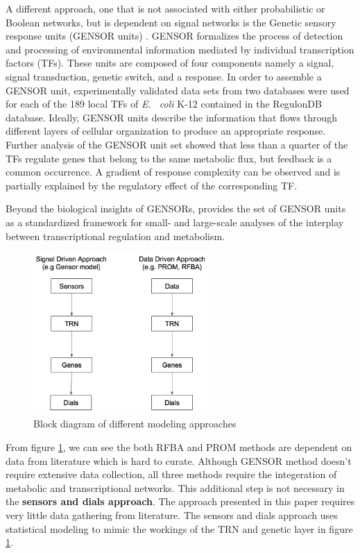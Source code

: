 \documentclass[12pt,chapterheads]{ucsd}
\begin{document}
A different approach, one that is not associated with either probabilistic or Boolean networks, but is dependent on signal networks is the Genetic sensory response units (GENSOR units) \cite{10.3389/fmicb.2017.01466}. GENSOR formalizes the process of detection and processing of environmental information mediated by individual transcription factors (TFs). These units are composed of four components namely a signal, signal transduction, genetic switch, and a response. In order to assemble a GENSOR unit,  experimentally validated data sets from two databases were used for each of the 189 local TFs of \textit{E. ~coli} K-12 contained in the RegulonDB database. Ideally, GENSOR units describe the information that flows through different layers of cellular organization to produce an appropriate response. Further analysis of the GENSOR unit set showed that less than a quarter of the TFs regulate genes that belong to the same metabolic flux, but feedback is a common occurrence. A gradient of response complexity can be observed and is partially explained by the regulatory effect of the corresponding TF. 

Beyond the biological insights of GENSORs, \cite{10.3389/fmicb.2017.01466} provides the set of GENSOR units as a standardized framework for small- and large-scale analyses of the interplay between transcriptional regulation and metabolism. 

\begin{figure}[h] 
\centering
\includegraphics[width=0.6\textwidth]{Figures/blk_diag}
\caption[Block diagram of different modeling approaches]
{Block diagram of different modeling approaches}
\label{fig:diff_sys}
\end{figure}

From figure \ref{fig:diff_sys}, we can see the both RFBA and PROM methods are dependent on data from literature which is hard to curate. Although GENSOR method doesn't require extensive data collection, all three methods require the integeration of metabolic and transcriptional networks. This additional step is not necessary in the \textbf{sensors and dials approach}. The approach presented in this paper requires very little data gathering from literature. The sensors and dials approach uses statistical modeling to mimic the workings of the TRN and genetic layer in figure \ref{fig:diff_sys}.
\end{document}
